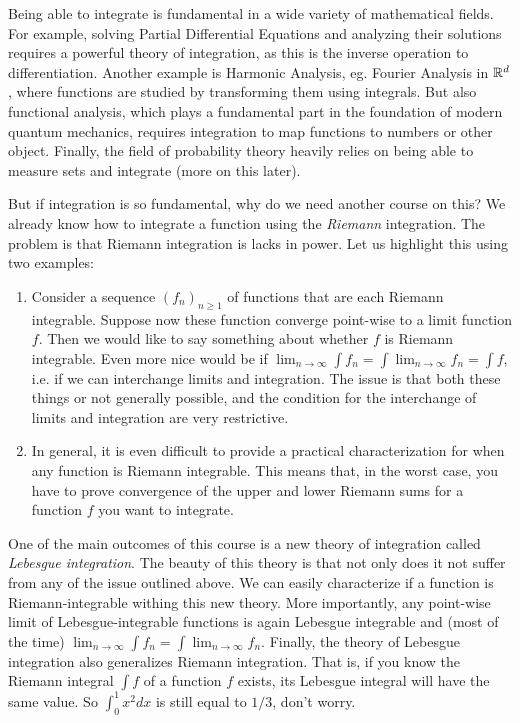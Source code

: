 Being able to integrate is fundamental in a wide variety of mathematical fields. For example, solving Partial Differential Equations and analyzing their solutions requires a powerful theory of integration, as this is the inverse operation to differentiation. Another example is Harmonic Analysis, eg. Fourier Analysis in $\mathbb R^d$, where functions are studied by transforming them using integrals. But also functional analysis, which plays a fundamental part in the foundation of modern quantum mechanics, requires integration to map functions to numbers or other object. Finally,  the field of probability theory heavily relies on being able to measure sets and integrate (more on this later). 

But if integration is so fundamental, why do we need another course on this? We already know how to integrate a function using the \emph{Riemann} integration. The problem is that Riemann integration is lacks in power. Let us highlight this using two examples:

\begin{enumerate}
\item Consider a sequence $(f_n)_{n \ge 1}$ of functions that are each Riemann integrable. Suppose now these function converge point-wise to a limit function $f$. Then we would like to say something about whether $f$ is Riemann integrable. Even more nice would be if $\lim_{n \to \infty} \int f_n = \int \lim_{n \to \infty} f_n = \int f$, i.e. if we can interchange limits and integration. The issue is that both these things or not generally possible, and the condition for the interchange of limits and integration are very restrictive.
\item In general, it is even difficult to provide a practical characterization for when any function is Riemann integrable. This means that, in the worst case, you have to prove convergence of the upper and lower Riemann sums for a function $f$ you want to integrate. 
\end{enumerate}

One of the main outcomes of this course is a new theory of integration called \emph{Lebesgue integration}. The beauty of this theory is that not only does it not suffer from any of the issue outlined above. We can easily characterize if a function is Riemann-integrable withing this new theory. More importantly, any point-wise limit of Lebesgue-integrable functions is again Lebesgue integrable and (most of the time) $\lim_{n \to \infty} \int f_n = \int \lim_{n \to \infty} f_n$. Finally, the theory of Lebesgue integration also generalizes Riemann integration. That is, if you know the Riemann integral $\int f$ of a function $f$ exists, its Lebesgue integral will have the same value. So $\int_0^1 x^2 dx$ is still equal to $1/3$, don't worry.

